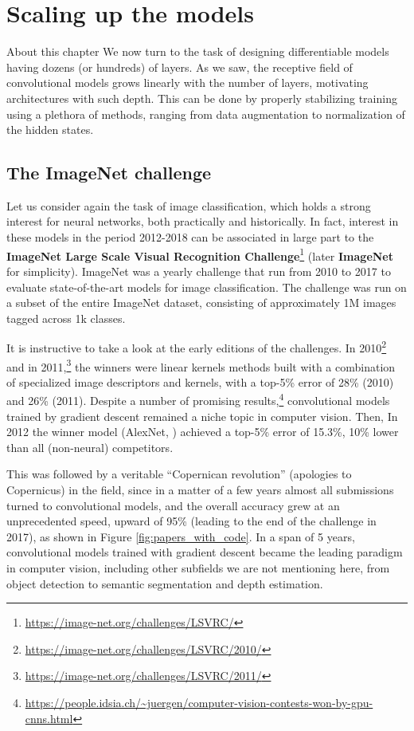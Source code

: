 \chapter{Scaling up the models}
\label{chap:deep_cnns}

\begin{supportbox}{About this chapter}
We now turn to the task of designing differentiable models having dozens (or hundreds) of layers. As we saw, the receptive field of convolutional models grows linearly with the number of layers, motivating architectures with such depth. This can be done by properly stabilizing training using a plethora of methods, ranging from data augmentation to normalization of the hidden states.
\end{supportbox}


\section{The ImageNet challenge}

Let us consider again the task of image classification, which holds a strong interest for neural networks, both practically and historically. In fact, interest in these models in the period 2012-2018 can be associated in large part to the \textbf{ImageNet Large Scale Visual Recognition Challenge}\footnote{\url{https://image-net.org/challenges/LSVRC/}} (later \textbf{ImageNet} for simplicity). ImageNet was a yearly challenge that run from 2010 to 2017 to evaluate state-of-the-art models for image classification. The challenge was run on a subset of the entire ImageNet dataset, consisting of approximately 1M images tagged across 1k classes. 

It is instructive to take a look at the early editions of the challenges. In 2010\footnote{\url{https://image-net.org/challenges/LSVRC/2010/}} and in 2011,\footnote{\url{https://image-net.org/challenges/LSVRC/2011/}} the winners were linear kernels methods built with a combination of specialized image descriptors and kernels, with a top-5\% error of 28\% (2010) and 26\% (2011). Despite a number of promising results,\footnote{\url{https://people.idsia.ch/~juergen/computer-vision-contests-won-by-gpu-cnns.html}} convolutional models trained by gradient descent remained a niche topic in computer vision. Then, In 2012 the winner model (AlexNet, \cite{krizhevsky2012imagenet}) achieved a top-5\% error of 15.3\%, 10\% lower than all (non-neural) competitors. 

This was followed by a veritable “Copernican revolution” (apologies to Copernicus) in the field, since in a matter of a few years almost all submissions turned to convolutional models, and the overall accuracy grew at an unprecedented speed, upward of 95\% (leading to the end of the challenge in 2017), as shown in Figure \ref{fig:papers_with_code}. In a span of 5 years, convolutional models trained with gradient descent became the leading paradigm in computer vision, including other subfields we are not mentioning here, from object detection to semantic segmentation and depth estimation.

